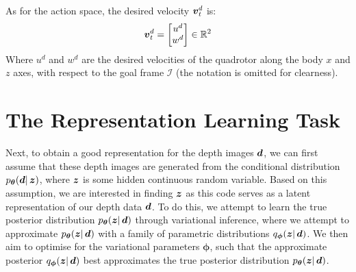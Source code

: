 As for the action space, the desired velocity ${\boldsymbol{v}}_t^d$ is:
\begin{equation}
    {\boldsymbol{v}}_t^d = \begin{bmatrix}
        u^d \\
        w^d
    \end{bmatrix} \in \mathbb{R}^{2}
    \label{eq:4_quadrotor_action_space}
\end{equation}
Where $u^d$ and $w^d$ are the desired velocities of the quadrotor along the body $x$ and $z$ axes, with respect to the goal frame $\mathcal{I}$ (the notation is omitted for clearness).

\section{The Representation Learning Task}
\label{sec:4_representation_learning_task}
Next, to obtain a good representation for the depth images ${\boldsymbol{d}}$, we can first assume that these depth images are generated from the conditional distribution $p_{\boldsymbol{\theta}}({\boldsymbol{d}} |\, \boldsymbol{z})$, where $\boldsymbol{z}$ is some hidden continuous random variable. Based on this assumption, we are interested in finding $\boldsymbol{z}$ as this code serves as a latent representation of our depth data ${\boldsymbol{d}}$. To do this, we attempt to learn the true posterior distribution $p_{\boldsymbol{\theta}}(\boldsymbol{z} |\, {\boldsymbol{d}})$ through variational inference, where we attempt to approximate $p_{\boldsymbol{\theta}}(\boldsymbol{z} |\, {\boldsymbol{d}})$ with a family of parametric distributions $q_{\boldsymbol{\phi}}(\boldsymbol{z} |\, {\boldsymbol{d}})$. We then aim to optimise for the variational parameters $\boldsymbol{\phi}$, such that the approximate posterior $q_{\boldsymbol{\phi}}(\boldsymbol{z} |\, {\boldsymbol{d}})$ best approximates the true posterior distribution $p_{\boldsymbol{\theta}}(\boldsymbol{z} |\, {\boldsymbol{d}})$.

